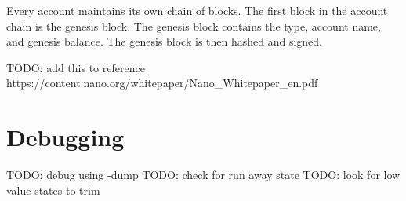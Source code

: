 \documentclass{report}
\begin{document}
Every account maintains its own chain of blocks. The first block in the account
chain is the genesis block. The genesis block contains the type, account name,
and genesis balance. The genesis block is then hashed and signed.



TODO: add this to reference\newline
https://content.nano.org/whitepaper/Nano\_Whitepaper\_en.pdf

\chapter{Debugging}

TODO: debug using -dump 
TODO: check for run away state 
TODO: look for low value states to trim
\end{document}
